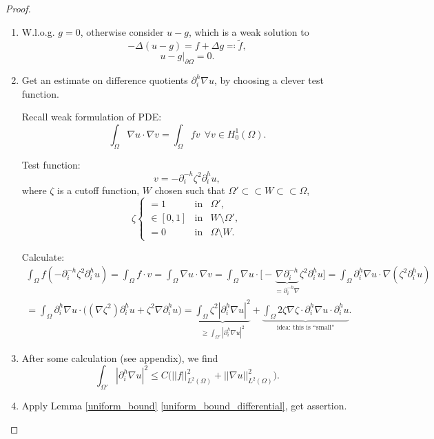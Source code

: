 \documentclass[12pt]{article}
\theoremstyle{definition}
\begin{document}
\begin{proof}
\begin{enumerate}[label=\arabic*.]
\item W.l.o.g. $g=0$, otherwise consider $u-g$, which is a weak solution to
\[-\Delta(u-g)=f+\Delta g\eqqcolon\tilde{f},\]
\[u-g|_{\partial\Omega}=0.\]

\item Get an estimate on difference quotients $\partial_i^h\nabla u$, by choosing a clever test function.

Recall weak formulation of PDE:
\begin{equation}\tag{W}\label{Weak}
\int_{\Omega}\nabla u\cdot\nabla v=\int_{\Omega}fv\ \ \forall v\in H_0^1(\Omega).
\end{equation}

Test function:
\[v=-\partial_i^{-h}\zeta^2\partial_i^hu,\]
where $\zeta$ is a cutoff function, $W$ chosen such that $\Omega'\subset\subset W\subset\subset\Omega$,
\[\zeta\left\{\begin{array}{lcl}=1&\text{in}&\Omega',\\\in[0,1]&\text{in}&W\setminus\Omega',\\=0&\text{in}&\Omega\setminus W.\end{array}\right.\]

Calculate:
\begin{multline*}
\int_{\Omega}f(-\partial_i^{-h}\zeta^2\partial_i^hu)=\int_{\Omega}f\cdot v=\int_{\Omega}\nabla u\cdot\nabla v=\int_{\Omega}\nabla u\cdot\big[-\underbrace{\nabla\partial_i^{-h}}_{=\partial_i^{-h}\nabla}\zeta^2\partial_i^hu\big]=\int_{\Omega}\partial_i^h\nabla u\cdot\nabla(\zeta^2\partial_i^hu)\\
=\int_{\Omega}\partial_i^h\nabla u\cdot\big((\nabla\zeta^2)\partial_i^hu+\zeta^2\nabla\partial_i^hu\big)=\underbrace{\int_{\Omega}\zeta^2|\partial_i^h\nabla u|^2}_{\geq\int_{\Omega'}|\partial_i^h\nabla u|^2}+\underbrace{\int_{\Omega}2\zeta\nabla\zeta\cdot\partial_i^h\nabla u\cdot\partial_i^hu}_{\text{idea: this is ``small''}}.
\end{multline*}

\item\label{reference_appendix} After some calculation (see appendix), we find
\[\int_{\Omega'}|\partial_i^h\nabla u|^2\leq C\big(||f||_{L^2(\Omega)}^2+||\nabla u||_{L^2(\Omega)}^2\big).\]

\item Apply Lemma \ref{uniform_bound} \ref{uniform_bound_differential}, get assertion.
\end{enumerate}
\end{proof}
\end{document}
